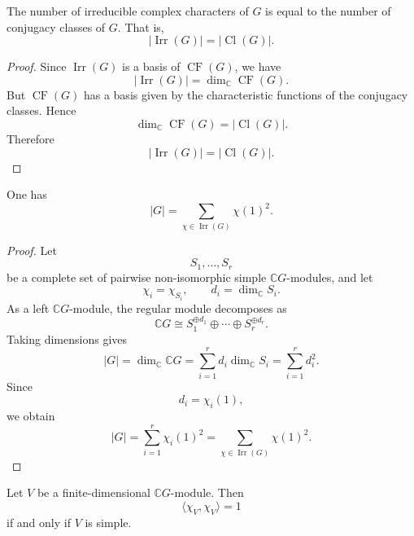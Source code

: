 \begin{corollary}
    The number of irreducible complex characters of \(G\) is equal to the number
    of conjugacy classes of \(G\). That is,
    \[
        |\operatorname{Irr}(G)|
        =
        |\operatorname{Cl}(G)|.
    \]
\end{corollary}

\begin{proof}
    Since \(\operatorname{Irr}(G)\) is a basis of \(\operatorname{CF}(G)\), we have
    \[
        |\operatorname{Irr}(G)|
        =
        \dim_{\mathbb{C}}\operatorname{CF}(G).
    \]
    But \(\operatorname{CF}(G)\) has a basis given by the characteristic functions
    of the conjugacy classes. Hence
    \[
        \dim_{\mathbb{C}}\operatorname{CF}(G)
        =
        |\operatorname{Cl}(G)|.
    \]
    Therefore
    \[
        |\operatorname{Irr}(G)|
        =
        |\operatorname{Cl}(G)|.
    \]
\end{proof}

\begin{lemma}
    One has
    \[
        |G|
        =
        \sum_{\chi\in \operatorname{Irr}(G)} \chi(1)^2.
    \]
\end{lemma}

\begin{proof}
    Let
    \[
        S_1,\dots,S_r
    \]
    be a complete set of pairwise non-isomorphic simple \(\mathbb{C}G\)-modules,
    and let
    \[
        \chi_i=\chi_{S_i},
        \qquad
        d_i=\dim_{\mathbb{C}}S_i.
    \]
    As a left \(\mathbb{C}G\)-module, the regular module decomposes as
    \[
        \mathbb{C}G
        \cong
        S_1^{\oplus d_1}
        \oplus
        \cdots
        \oplus
        S_r^{\oplus d_r}.
    \]
    Taking dimensions gives
    \[
        |G|
        =
        \dim_{\mathbb{C}}\mathbb{C}G
        =
        \sum_{i=1}^r d_i\dim_{\mathbb{C}}S_i
        =
        \sum_{i=1}^r d_i^2.
    \]
    Since
    \[
        d_i=\chi_i(1),
    \]
    we obtain
    \[
        |G|
        =
        \sum_{i=1}^r \chi_i(1)^2
        =
        \sum_{\chi\in \operatorname{Irr}(G)} \chi(1)^2.
    \]
\end{proof}

\begin{corollary}
    Let \(V\) be a finite-dimensional \(\mathbb{C}G\)-module. Then
    \[
        \langle \chi_V,\chi_V\rangle=1
    \]
    if and only if \(V\) is simple.
\end{corollary}

